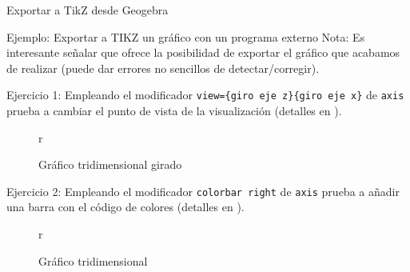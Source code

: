 \documentclass{beamer}
\begin{document}
\begin{frame}{Exportar a TikZ desde Geogebra}
\begin{exampleblock}{Ejemplo: Exportar a TIKZ  un gr\'afico con un programa externo}
Nota: Es interesante se\~nalar que ofrece la posibilidad de exportar el gr\'afico
que acabamos de realizar (puede dar errores no sencillos de detectar/corregir).
\end{exampleblock}
\end{frame}


\begin{frame}[fragile]{Ejercicio 1:}
Empleando el modificador \verb|view={giro eje z}{giro eje x}| de \verb|axis| prueba a cambiar el 
punto de vista de la visualizaci\'on (detalles en \cite{ManualPGFPlots}).

\begin{figure}{r}
\caption{Gr\'afico tridimensional girado}
\end{figure}
\end{frame}

\begin{frame}[fragile]{Ejercicio 2:}
Empleando el modificador \verb|colorbar right| de \verb|axis| prueba a añadir una barra con 
el c\'odigo de colores (detalles en \cite{ManualPGFPlots}).

\begin{figure}{r}
\caption{Gr\'afico tridimensional}
\end{figure}
\end{frame}
\end{document}
